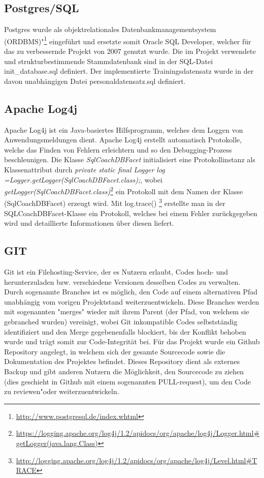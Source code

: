 \documentclass[fleqn,10pt,ngerman]{SelfArx}
\begin{document}
	\subsection{Postgres/SQL}
	Postgres wurde als objektrelationales Datenbankmanagementsystem (ORDBMS)"\footnote{\url{http://www.postgresql.de/index.whtml}} eingeführt und ersetzte somit Oracle SQL Developer, welcher für das zu verbessernde Projekt von 2007  genutzt wurde. 
	Die im Projekt verwendete und strukturbestimmende Stammdatenbank sind in der SQL-Datei init\_database.sql definiert. Der implementierte Trainingsdatensatz wurde in der davon unabhängigen Datei personaldatensatz.sql definiert.

	\subsection{Apache Log4j}\label{log4j}
	Apache Log4j ist ein Java-basiertes Hilfsprogramm, welches dem Loggen von Anwendungsmeldungen dient. 
	Apache Log4j erstellt automatisch Protokolle, welche das Finden von Fehlern erleichtern und so den Debugging-Prozess beschleunigen.
	Die Klasse \textit{SqlCoachDBFacet} initialisiert eine Protokollinstanz als Klassenattribut durch \newline\textit{private static final Logger log =\newline Logger.getLogger(SqlCoachDBFacet.class);}, wobei\newline
	\textit{getLogger(SqlCoachDBFacet.class)}\footnote{\url{https://logging.apache.org/log4j/1.2/apidocs/org/apache/log4j/Logger.html\#getLogger(java.lang.Class)}} ein Protokoll mit dem Namen der Klasse (SqlCoachDBFacet) erzeugt wird. Mit log.trace() \footnote{\url{http://logging.apache.org/log4j/1.2/apidocs/org/apache/log4j/Level.html\#TRACE}} erstellte man in der SQLCoachDBFacet-Klasse ein Protokoll, welches bei einem Fehler zurückgegeben wird und detaillierte Informationen über diesen liefert.
	
	
	
	\subsection{GIT}
	Git ist ein Filehosting-Service, der es Nutzern erlaubt,  Codes hoch- und herunterzuladen bzw. verschiedene Versionen desselben Codes zu verwalten. Durch sogenannte Branches ist es möglich, den Code auf einem alternativen Pfad unabhängig vom vorigen Projektstand weiterzuentwickeln. Diese Branches werden mit sogenannten "merges" wieder mit ihrem Parent (der Pfad, von welchem sie gebranched wurden) vereinigt, wobei Git inkompatible Codes selbstständig identifiziert und den Merge gegebenenfalls blockiert, bis der Konflikt behoben wurde und trägt somit zur Code-Integrität bei. 
	Für das Projekt wurde ein Github Repository  angelegt, in welchem sich der gesamte Sourcecode sowie die Dokumentation des Projektes befindet. Dieses Repository dient  als externes Backup und gibt anderen Nutzern die Möglichkeit, den Sourcecode zu ziehen (dies geschieht in Github mit einem sogenannten PULL-request), um den Code zu \dq reviewen"\dq oder weiterzuentwickeln. 
	
\end{document}
